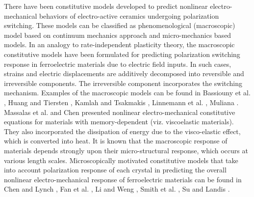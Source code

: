 There have been constitutive models developed to predict nonlinear electro-mechanical behaviors of electro-active ceramics undergoing polarization switching.
These models can be classified as phenomenological (macroscopic) model based on continuum mechanics approach and micro-mechanics based models.
In an analogy to rate-independent plasticity theory, the macroscopic constitutive models have been formulated for predicting polarization switching response in ferroelectric materials due to electric field inputs. 
In such cases, strains and electric displacements are additively decomposed into reversible and irreversible components.
The irreversible component incorporates the switching mechanism. 
Examples of the macroscopic models can be found in Bassiouny et al. \cite{Bassiouny1988,Bassiouny19881297}, Huang and Tiersten \cite{huang1998electroelastic,huang1998analytical}, Kamlah and Tsakmakis \cite{kamlahphenomenological1999}, Linnemann et al. \cite{Linnemann20091149}, Muliana \cite{Muliana2011}. 
Massalas et al. \cite{Massalas19941075} and Chen \cite{Chen201049} presented nonlinear electro-mechanical constitutive equations for materials with memory-dependent (viz. viscoelastic materials). 
They also incorporated the dissipation of energy due to the visco-elastic effect, which is converted into heat. 
It is known that the macroscopic response of materials depends strongly upon their micro-structural response, which occurs at various length scales. 
Microscopically motivated constitutive models that take into account polarization response of each crystal in predicting the overall nonlinear electro-mechanical response of ferroelectric materials can be found in Chen and Lynch \cite{chena1998}, Fan et al. \cite{raey}, Li and Weng \cite{Li19993493,Li200179}, Smith et al. \cite{Smith2003719,Smith200646}, Su and Landis \cite{Su2007280}.

